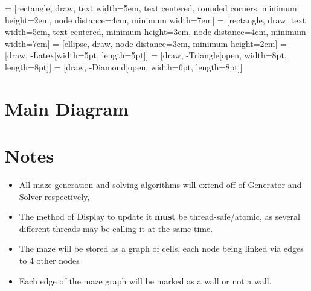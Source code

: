 \documentclass{article}
\begin{document}
\thispagestyle{empty}



\tikzset{line width=10pt}
 = [rectangle, draw,
text width=5em, text centered, rounded corners, minimum height=2em,
node distance=4cm, minimum width=7em]
 = [rectangle, draw,
text width=5em, text centered, minimum height=3em,
node distance=4cm, minimum width=7em]
 = [ellipse, draw, node distance=3cm,
minimum height=2em]
 = [draw, -{Latex[width=5pt, length=5pt]}]
 = [draw, -{Triangle[open, width=8pt, length=8pt]}]
 = [draw, -{Diamond[open, width=6pt, length=8pt]}]
\usetikzlibrary{positioning}

\section{Main Diagram}
\begin{center}
\end{center}

\section{Notes}
\begin{itemize}
    \item All maze generation and solving algorithms will extend off of Generator and Solver respectively,
    \item The method of Display to update it \textbf{must} be thread-safe/atomic, as several different threads may be calling it
          at the same time.
    \item The maze will be stored as a graph of cells, each node being linked via edges to 4 other nodes
    \item Each edge of the maze graph will be marked as a wall or not a wall.
\end{itemize}
\end{document}
